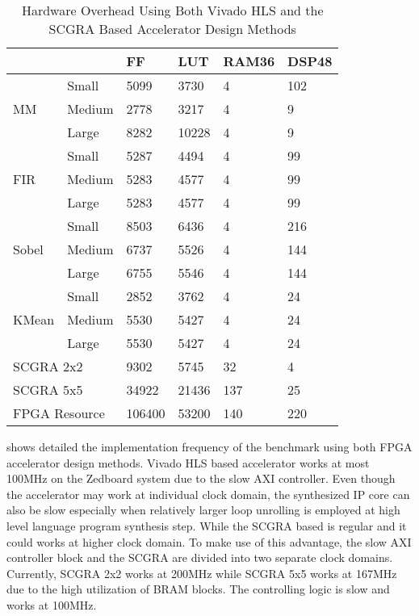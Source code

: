 \begin{table}[h]
\centering
\caption{Hardware Overhead Using Both Vivado HLS and the SCGRA Based Accelerator Design Methods}
\label{tab:hardware-overhead-comparison}
\begin{tabular}{|l|l|l|l|l|l|}
\hline
\multicolumn{2}{|l|}{} & FF  & LUT & RAM36 & DSP48 \\ \hline
\multirow{3}{*}{MM}& Small & 5099 & 3730 & 4 & 102 \\ \cline{2-6} 
                   & Medium & 2778 & 3217 & 4 & 9 \\ \cline{2-6} 
                   & Large & 8282 & 10228 & 4 & 9 \\ \hline
\multirow{3}{*}{FIR}& Small & 5287 & 4494 & 4 & 99 \\ \cline{2-6} 
                   & Medium & 5283 & 4577 & 4 & 99 \\ \cline{2-6} 
                   & Large & 5283 & 4577 & 4 & 99 \\ \hline
\multirow{3}{*}{Sobel}& Small & 8503 & 6436 & 4 & 216 \\ \cline{2-6} 
                   & Medium & 6737 & 5526 & 4 & 144 \\ \cline{2-6} 
                   & Large & 6755 & 5546 & 4 & 144 \\ \hline
\multirow{3}{*}{KMean}& Small & 2852 & 3762 & 4 & 24 \\ \cline{2-6} 
                   & Medium & 5530 & 5427 & 4 & 24 \\ \cline{2-6} 
                   & Large & 5530 & 5427 & 4 & 24 \\ \hline
\multicolumn{2}{|l|}{SCGRA 2x2} & 9302 & 5745 & 32 & 4  \\ \hline
\multicolumn{2}{|l|}{SCGRA 5x5} & 34922 & 21436 & 137 & 25 \\ \hline
\multicolumn{2}{|l|}{FPGA Resource} & 106400 & 53200 & 140 & 220 \\ \hline
\end{tabular}
\end{table}

 shows detailed the implementation frequency of the benchmark using both FPGA accelerator design methods. Vivado HLS based accelerator works at most 100MHz on the Zedboard system due to the slow AXI controller. Even though the accelerator may work at individual clock domain, the synthesized IP core can also be slow especially when relatively larger loop unrolling is employed at high level language program synthesis step. While the SCGRA based is regular and it could works at higher clock domain. To make use of this advantage, the slow AXI controller block and the SCGRA are divided into two separate clock domains. Currently, SCGRA 2x2 works at 200MHz while SCGRA 5x5 works at 167MHz due to the high utilization of BRAM blocks. The controlling logic is slow and works at 100MHz.

